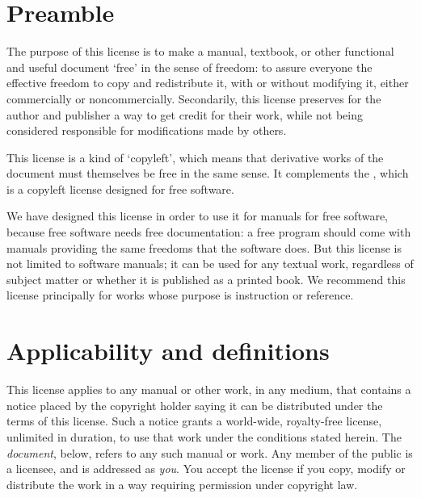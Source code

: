 \begin{multicols}{3}

\setlength{\ftextwidth}{\linewidth}
\addtolength{\ftextwidth}{-2\fboxsep}
\addtolength{\ftextwidth}{-2\fboxrule}

\section{Preamble}
\label{fdl:preamble}

The purpose of this license is to make a manual, textbook, or other functional and useful document \enquote*{free} in the sense of freedom: to assure everyone the effective freedom to copy and redistribute it, with or without modifying it, either commercially or noncommercially. Secondarily, this license preserves for the author and publisher a way to get credit for their work, while not being considered responsible for modifications made by others.

This license is a kind of \enquote*{copyleft}, which means that derivative works of the document must themselves be free in the same sense. It complements the \gpl, which is a copyleft license designed for free software.

We have designed this license in order to use it for manuals for free software, because free software needs free documentation: a free program should come with manuals providing the same freedoms that the software does. But this license is not limited to software manuals; it can be used for any textual work, regardless of subject matter or whether it is published as a printed book. We recommend this license principally for works whose purpose is instruction or reference.

\section{Applicability and definitions}
\label{fdl:defs}

This license applies to any manual or other work, in any medium, that contains a notice placed by the copyright holder saying it can be distributed under the terms of this license. Such a notice grants a world-wide, royalty-free license, unlimited in duration, to use that work under the conditions stated herein. The \emph{document}, below, refers to any such manual or work. Any member of the public is a licensee, and is addressed as \emph{you}. You accept the license if you copy, modify or distribute the work in a way requiring permission under copyright law.


\end{multicols}
